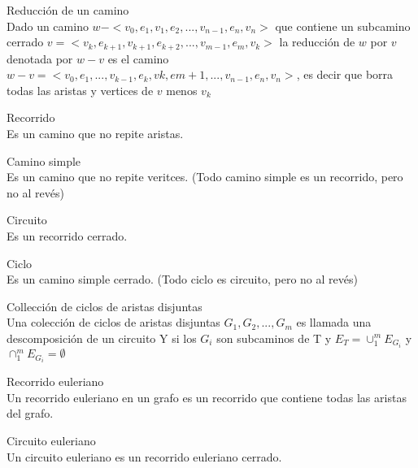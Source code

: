 \documentclass{article}
\begin{document}
\begin{defn}
Reducción de un camino \\ Dado un camino $w-< v_{0}, e_{1}, v_{1}, e_{2},..., v_{n-1}, e_{n}, v_{n} >$ que contiene un subcamino cerrado $v = < v_{k}, e_{k+1}, v_{k+1}, e_{k+2},..., v_{m-1}, e_{m}, v_{k} >$ la reducción de $w$ por $v$ denotada por $w-v$ es el camino $w-v=< v_{0}, e_{1},...,v_{k-1},e_{k}, v{k},e{m+1},..., v_{n-1}, e_{n}, v_{n} >$, es decir que borra todas las aristas y vertices de $v$ menos $v_{k}$
\end{defn}

\begin{defn}
Recorrido \\ Es un camino que no repite aristas.
\end{defn}

\begin{defn}
Camino simple \\ Es un camino que no repite veritces. (Todo camino simple es un recorrido, pero no al revés)
\end{defn}

\begin{defn}
Circuito \\ Es un recorrido cerrado.
\end{defn}

\begin{defn}
Ciclo \\ Es un camino simple cerrado. (Todo ciclo es circuito, pero no al revés)
\end{defn}

\begin{defn}
Collección de ciclos de aristas disjuntas \\ Una colección de ciclos de aristas disjuntas $G_{1}, G_{2},..., G_{m}$ es llamada una descomposición de un circuito Y si los $G_{i}$ son subcaminos de T y $E_{T} = \cup_{1}^{m}E_{G_{i}}$ y $\cap_{1}^{m}E_{G_{i}} = \emptyset$
\end{defn}

\begin{defn}
Recorrido euleriano \\ Un recorrido euleriano en un grafo es un recorrido que contiene todas las aristas del grafo.
\end{defn}

\begin{defn}
Circuito euleriano \\ Un circuito euleriano es un recorrido euleriano cerrado.
\end{defn}
\end{document}

